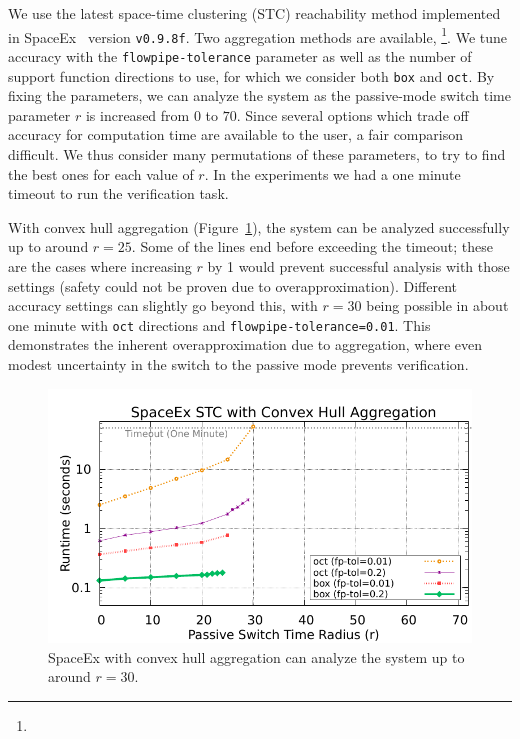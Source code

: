We use the latest space-time clustering (STC) reachability method implemented in SpaceEx~\cite{frehse2013flowpipe} version \texttt{v0.9.8f}.
%
Two aggregation methods are available, \footnote{}\new{)}.
%
We tune accuracy with the \texttt{flowpipe-tolerance} parameter as well as the number of support function directions to use, for which we consider
both \texttt{box} and \texttt{oct}.
%
By fixing the parameters, we can analyze the system as the passive-mode switch time parameter $r$ is increased from $0$ to $70$.
%
Since several options which trade off accuracy for computation time are available to the user, a fair comparison difficult.
%
We thus consider many permutations of these parameters, to try to find the best ones for each value of $r$.
%
In the experiments we had a one minute timeout to run the verification task.

With convex hull aggregation (Figure~\ref{fig:spaceex_chull}), the system can be analyzed successfully up to around $r=25$.
%
Some of the lines end before exceeding the timeout; these are the cases where increasing $r$ by 1 would prevent
successful analysis with those settings (safety could not be proven due to overapproximation).
%
Different accuracy settings can slightly go beyond this, with $r=30$ being possible in about one minute with \texttt{oct} directions and
\texttt{flowpipe-tolerance=0.01}.
%
This demonstrates the inherent overapproximation due to aggregation, where even modest uncertainty in the switch to the passive mode
prevents verification.

\begin{figure}[t]
\centerline{\includegraphics[width=0.9\columnwidth]{images/chull.pdf}}
\caption{SpaceEx with convex hull aggregation can analyze the system up to around $r=30$.}
\label{fig:spaceex_chull}
\end{figure}

